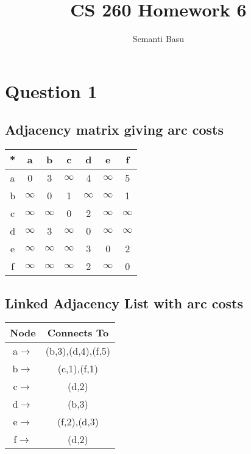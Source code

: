 \documentclass{article}
\begin{document}
\title {CS 260 Homework 6}
\author{Semanti Basu}
\maketitle


\section*{Question 1}
\subsection*{Adjacency matrix giving arc costs}
\begin{center}
\begin{tabular}{c|c|c|c|c|c|c|}
\hline
* & a & b & c & d & e & f\\ \hline
a & 0 & 3 & $\infty$ & 4 & $\infty$ & 5\\ \hline
b & $\infty$ & 0 & 1 & $\infty$ & $\infty$ & 1\\ \hline
c & $\infty$ & $\infty$ & 0 & 2 & $\infty$ & $\infty$\\ \hline
d & $\infty$ & 3 & $\infty$ & 0 & $\infty$ & $\infty$\\ \hline
e & $\infty$ & $\infty$ & $\infty$ & 3 & 0 & 2\\ \hline
f & $\infty$ & $\infty$ & $\infty$ & 2 & $\infty$ & 0\\ \hline
\end{tabular}
\end{center}




\subsection*{Linked Adjacency List with arc costs}
\begin{center}
\begin{tabular}{c|c|}
\hline
Node & Connects To\\ \hline
a$\rightarrow$ & (b,3),(d,4),(f,5)\\ \hline
b$\rightarrow$ & (c,1),(f,1)\\ \hline
c$\rightarrow$ & (d,2)\\ \hline
d$\rightarrow$ & (b,3)\\ \hline
e$\rightarrow$ & (f,2),(d,3)\\ \hline
f$\rightarrow$ & (d,2)\\ \hline
\end{tabular}
\end{center}
\end{document}
